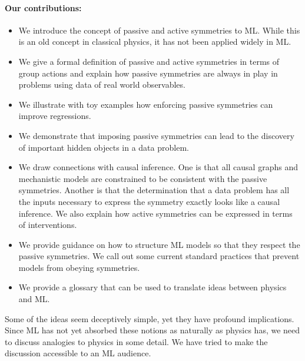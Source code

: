 \documentclass[preprint]{article} %
\begin{document}
\paragraph{Our contributions:}
\begin{itemize}
\item
We introduce the concept of passive and active symmetries to ML.
While this is an old concept in classical physics, it has not been applied widely in ML.
\item
We give a formal definition of passive and active symmetries in terms of group actions and explain how passive symmetries are always in play in problems using data of real world observables.
\item
We illustrate with toy examples how enforcing passive symmetries can improve regressions. 
\item
We demonstrate that imposing passive symmetries can lead to the discovery of important hidden objects in a data problem.
\item
We draw connections with causal inference.
One is that all causal graphs and mechanistic models are constrained to be consistent with the passive symmetries.
Another is that the determination that a data problem has all the inputs necessary to express the symmetry exactly looks like a causal inference. 
We also explain how active symmetries can be expressed in terms of interventions.
\item 
We provide guidance on how to structure ML models so that they respect the passive symmetries. We call out some current standard practices that prevent models from obeying symmetries. 
\item
We provide a glossary that can be used to translate ideas between physics and ML. 
\end{itemize}
Some of the ideas seem deceptively simple, yet they have profound implications. Since ML has not yet absorbed these notions as naturally as physics has, we need to discuss analogies to physics in some detail. We have tried to make the discussion accessible to an ML audience.
\end{document}
